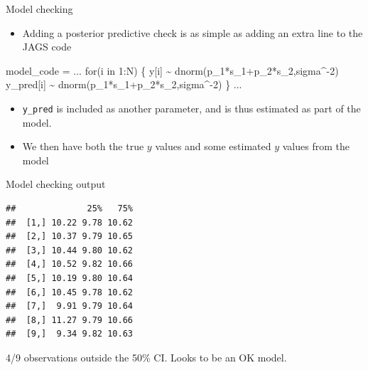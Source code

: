 \documentclass[
  ignorenonframetext,
  aspectratio=169]{beamer}
\newenvironment{Shaded}{\begin{snugshade}}{\end{snugshade}}
\newcommand{\AttributeTok}[1]{\textcolor[rgb]{0.77,0.63,0.00}{#1}}
\newcommand{\DecValTok}[1]{\textcolor[rgb]{0.00,0.00,0.81}{#1}}
\newcommand{\FloatTok}[1]{\textcolor[rgb]{0.00,0.00,0.81}{#1}}
\newcommand{\FunctionTok}[1]{\textcolor[rgb]{0.00,0.00,0.00}{#1}}
\newcommand{\NormalTok}[1]{#1}
\newcommand{\OtherTok}[1]{\textcolor[rgb]{0.56,0.35,0.01}{#1}}
\newcommand{\SpecialCharTok}[1]{\textcolor[rgb]{0.00,0.00,0.00}{#1}}
\newcommand{\StringTok}[1]{\textcolor[rgb]{0.31,0.60,0.02}{#1}}
\providecommand{\tightlist}{%
  \setlength{\itemsep}{0pt}\setlength{\parskip}{0pt}}
\begin{document}
\begin{frame}[fragile]{Model checking}
\protect\hypertarget{model-checking}{}
\begin{itemize}
\tightlist
\item
  Adding a posterior predictive check is as simple as adding an extra
  line to the JAGS code
\end{itemize}

\begin{Shaded}
\begin{Highlighting}[]
\NormalTok{model\_code }\OtherTok{=}\StringTok{\textquotesingle{}}
\StringTok{  ...}
\StringTok{  for(i in 1:N) \{ }
\StringTok{    y[i] \textasciitilde{} dnorm(p\_1*s\_1+p\_2*s\_2,sigma\^{}{-}2) }
\StringTok{    y\_pred[i] \textasciitilde{} dnorm(p\_1*s\_1+p\_2*s\_2,sigma\^{}{-}2) }
\StringTok{  \}}
\StringTok{  ...}
\StringTok{\textquotesingle{}}
\end{Highlighting}
\end{Shaded}

\begin{itemize}
\tightlist
\item
  \texttt{y\_pred} is included as another parameter, and is thus
  estimated as part of the model.
\item
  We then have both the true \(y\) values and some estimated \(y\)
  values from the model
\end{itemize}
\end{frame}

\begin{frame}[fragile]{Model checking output}
\protect\hypertarget{model-checking-output}{}
\small

\begin{Shaded}
\end{Shaded}

\begin{verbatim}
##              25%   75%
##  [1,] 10.22 9.78 10.62
##  [2,] 10.37 9.79 10.65
##  [3,] 10.44 9.80 10.62
##  [4,] 10.52 9.82 10.66
##  [5,] 10.19 9.80 10.64
##  [6,] 10.45 9.78 10.62
##  [7,]  9.91 9.79 10.64
##  [8,] 11.27 9.79 10.66
##  [9,]  9.34 9.82 10.63
\end{verbatim}

4/9 observations outside the 50\% CI. Looks to be an OK model.
\end{frame}
\end{document}
